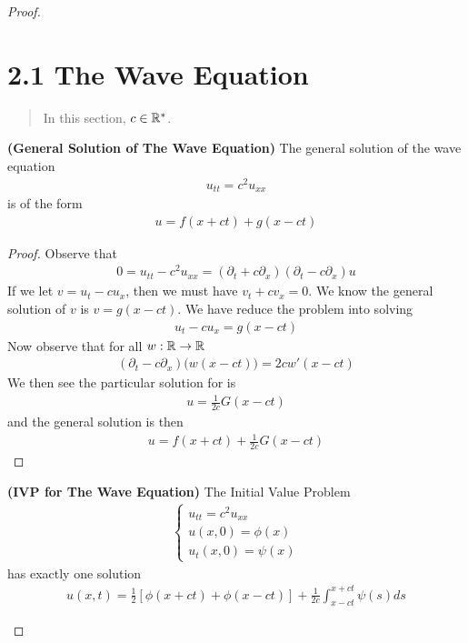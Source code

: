 \documentclass{report}
\begin{document}
\begin{proof}
\section{2.1 The Wave Equation}
\begin{abstract}
In this section, $c\in\mathbb{R}^*$. 
\end{abstract}
\begin{theorem}
\textbf{(General Solution of The Wave Equation)} The general solution of the wave equation 
\begin{align*}
u_{tt}=c^2u_{xx}
\end{align*}
is of the form 
\begin{align*}
u=f(x+ct)+g(x-ct)
\end{align*}
\end{theorem}
\begin{proof}
Observe that 
\begin{align*}
0=u_{tt}-c^2u_{xx}=(\partial_t + c\partial_x)(\partial_t - c\partial_x)u
\end{align*}
If we let $v=u_t-cu_x$, then we must have $v_t+cv_x=0$. We know the general solution of $v$ is $v=g(x-ct)$. We have reduce the problem into solving  
\begin{align}
\label{ime}
u_t-cu_x=g(x-ct)
\end{align}
Now observe that for all $w:\mathbb{R}\rightarrow \mathbb{R}$
\begin{align*}
  (\partial_t - c \partial_x)\big(w(x-ct) \big)=2cw'(x-ct)
\end{align*}
We then see the particular solution for  is 
\begin{align*}
u= \frac{1}{2c}G(x-ct)
\end{align*}
and the general solution is then 
\begin{align*}
u=f(x+ct)+\frac{1}{2c}G(x-ct)
\end{align*}
\end{proof}
\begin{theorem}
\textbf{(IVP for The Wave Equation)} The Initial Value Problem 
\begin{align*}
\begin{cases}
  u_{tt}=c^2u_{xx} \\
  u(x,0)=\phi (x)\\
  u_t(x,0)=\psi (x)
\end{cases}
\end{align*}
has exactly one solution 
\begin{align*}
u(x,t)=\frac{1}{2}[ \phi (x+ct)+\phi (x-ct)]+ \frac{1}{2c}\int_{x-ct}^{x+ct}\psi (s)ds

\end{align*}
\end{theorem}
\end{proof}
\end{document}
